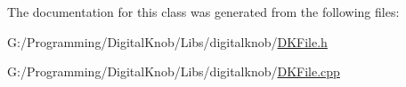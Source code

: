 The documentation for this class was generated from the following files\-:\begin{DoxyCompactItemize}
\item 
G\-:/\-Programming/\-Digital\-Knob/\-Libs/digitalknob/\hyperlink{_d_k_file_8h}{D\-K\-File.\-h}\item 
G\-:/\-Programming/\-Digital\-Knob/\-Libs/digitalknob/\hyperlink{_d_k_file_8cpp}{D\-K\-File.\-cpp}\end{DoxyCompactItemize}
